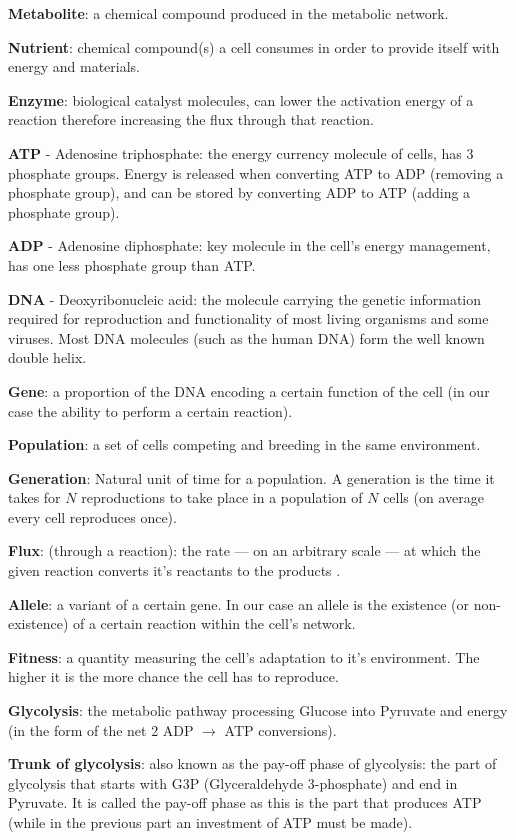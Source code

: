 \documentclass[a4paper,12pt]{article}
\begin{document}
	\begin{framed}

		\textbf{Metabolite}: a chemical compound produced in the metabolic network. 

		\textbf{Nutrient}: chemical compound(s) a cell consumes in order to provide itself with energy and materials.

		\textbf{Enzyme}: biological catalyst molecules, can lower the activation energy of a reaction therefore increasing the flux through that reaction. 

	\textbf{ATP} - Adenosine triphosphate: the energy currency molecule of cells, has 3 phosphate groups. Energy is released when converting ATP to ADP (removing a phosphate group), and can be stored by converting ADP to ATP (adding a phosphate group).

	\textbf{ADP} - Adenosine diphosphate: key molecule in the cell's energy management, has one less phosphate group than ATP.

	\textbf{DNA} - Deoxyribonucleic acid: the molecule carrying the genetic information required for reproduction and functionality of most living organisms and some viruses. Most DNA molecules (such as the human DNA) form the well known double helix. 

	\textbf{Gene}: a proportion of the DNA encoding a certain function of the cell (in our case the ability to perform a certain reaction). 

	\textbf{Population}: a set of cells competing and breeding in the same environment.

	\textbf{Generation}: Natural unit of time for a population. A generation is the time it takes for $N$ reproductions to take place in a population of $N$ cells (on average every cell reproduces once).

	\textbf{Flux}: (through a reaction): the rate ---  on an arbitrary scale --- at which the given reaction converts it's reactants to the products . 

	\textbf{Allele}: a variant of a certain gene. In our case an allele is the existence (or non-existence) of a certain reaction within the cell's network.

	\textbf{Fitness}: a quantity measuring the cell's adaptation to it's environment. The higher it is the more chance the cell has to reproduce.

	\textbf{Glycolysis}: the metabolic pathway processing Glucose into Pyruvate and energy (in the form of the net 2 ADP $\rightarrow$ ATP conversions).

	\textbf{Trunk of glycolysis}: also known as the pay-off phase of glycolysis: the part of glycolysis that starts with G3P (Glyceraldehyde 3-phosphate) and end in Pyruvate. It is called the pay-off phase as this is the part that produces ATP (while in the previous part an investment of ATP must be made).

	\end{framed}
\end{document}
